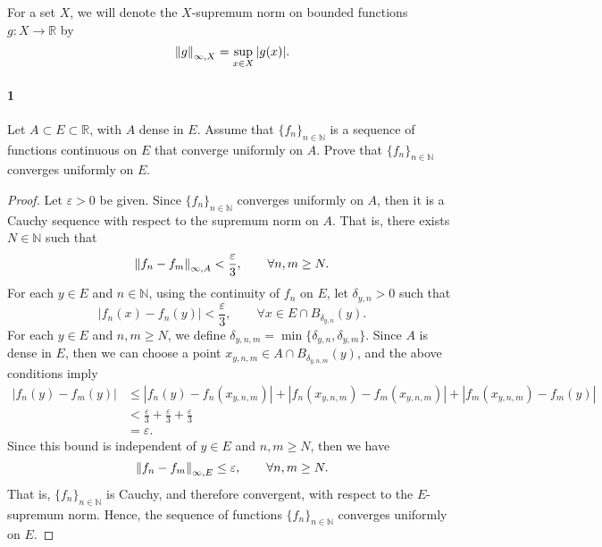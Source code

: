 \documentclass[12pt]{article}
\newenvironment{fullbox}{\begin{lrbox}{\savefullbox}\begin{minipage}{\dimexpr\textwidth-2\fboxsep\relax}}{\end{minipage}\end{lrbox}\begin{center}\framebox[\textwidth]{\usebox{\savefullbox}}\end{center}}
\newenvironment{pbox}[1][]{\begin{fullbox}\ifx#1\empty\else\paragraph{#1}\fi}{\end{fullbox}}
\theoremstyle{definition}
\newcommand{\N}{\mathbb{N}}
\newcommand{\R}{\mathbb{R}}
\newcommand{\eps}{\varepsilon}
\newcommand{\seq}[2]{\{#1\}_{#2\in\N}}
\begin{document}
\thispagestyle{title}

\noindent
For a set $X$, we will denote the $X$-supremum norm on bounded functions $g : X \to \R$ by
\[
    \norm{g}_{\infty,X} = \sup_{x \in X}|g(x)|.
\]

\begin{pbox}[1]
    Let  $A\subset E\subset \R$, with $A$ dense in $E$. Assume that $\{f_n\}_{n\in \N}$ is a sequence of functions continuous on $E$ that converge uniformly on $A$. Prove that $\{f_n\}_{n\in \N}$ converges uniformly on $E$.
\end{pbox}



\begin{proof}
    Let $\eps > 0$ be given. Since $\seq{f_n}{n}$ converges uniformly on $A$, then it is a Cauchy sequence with respect to the supremum norm on $A$. That is, there exists $N \in \N$ such that
    \[
        \norm{f_n - f_m}_{\infty, A} < \frac{\eps}{3}, \qquad \forall n, m \geq N.
    \]
    For each $y \in E$ and $n \in \N$, using the continuity of $f_n$ on $E$, let $\delta_{y,n} > 0$ such that
    \[
        |f_n(x) - f_n(y)| < \frac{\eps}{3}, \qquad \forall x \in E \cap B_{\delta_{y,n}}(y).
    \]
    For each $y \in E$ and $n, m \geq N$, we define $\delta_{y, n, m} = \min\{\delta_{y, n}, \delta_{y, m}\}$. Since $A$ is dense in $E$, then we can choose a point $x_{y,n,m} \in A \cap B_{\delta_{y, n, m}}(y)$, and the above conditions imply
    \begin{align*}
        |f_n(y) - f_m(y)|
            &\leq |f_n(y) - f_n(x_{y,n,m})| + |f_n(x_{y,n,m}) - f_m(x_{y,n,m})| + |f_m(x_{y,n,m}) - f_m(y)| \\
            &< \frac{\eps}{3} + \frac{\eps}{3} + \frac{\eps}{3} \\
            &= \eps.
    \end{align*}
    Since this bound is independent of $y \in E$ and $n, m \geq N$, then we have
    \[
        \norm{f_n - f_m}_{\infty,E} \leq \eps, \qquad \forall n, m \geq N.
    \]
    That is, $\seq{f_n}{n}$ is Cauchy, and therefore convergent, with respect to the $E$-supremum norm. Hence, the sequence of functions $\seq{f_n}{n}$ converges uniformly on $E$.
    
\end{proof}
\end{document}
